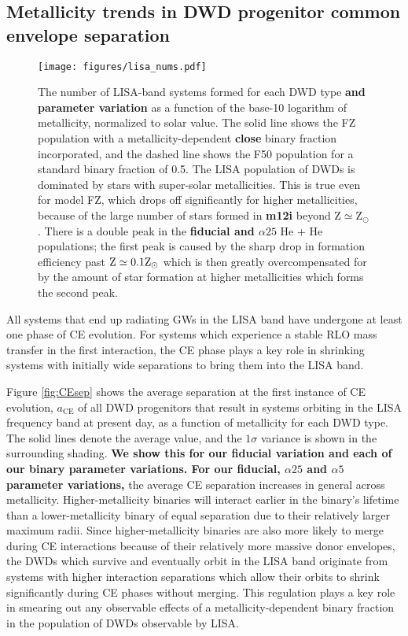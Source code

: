 \documentclass[twocolumn, linenumbers]{aastex631}
\begin{document}
\subsection{Metallicity trends in DWD progenitor common envelope separation}\label{sec:CEsep}

\begin{figure*}
	\texttt{[image: figures/lisa\_nums.pdf]}
    \caption{The number of LISA-band systems formed for each DWD type \textbf{and parameter variation} as a function of the base-10 logarithm of metallicity, normalized to solar value. The solid line shows the FZ population with a metallicity-dependent \textbf{close} binary fraction incorporated, and the dashed line shows the F50 population for a standard binary fraction of 0.5. The LISA population of DWDs is dominated by stars with super-solar metallicities. This is true even for model FZ, which drops off significantly for higher metallicities, because of the large number of stars formed in \textbf{m12i} beyond Z$\simeq$Z$_\odot$. There is a double peak in the \textbf{fiducial and $\alpha25$} He + He populations; the first peak is caused by the sharp drop in formation efficiency past $\rm{Z}\simeq0.1 \rm{Z}_\odot$ which is then greatly overcompensated for by the amount of star formation at higher metallicities which forms the second peak.}
    \label{fig:lisa_nums}
\end{figure*}

All systems that end up radiating GWs in the LISA band have undergone at least one phase of CE evolution. For systems which experience a stable RLO mass transfer in the first interaction, the CE phase plays a key role in shrinking systems with initially wide separations to bring them into the LISA band. 

Figure \ref{fig:CEsep} shows the average separation at the first instance of CE evolution, $a_{\text{CE}}$ of all DWD progenitors that result in systems orbiting in the LISA frequency band at present day, as a function of metallicity for each DWD type. The solid lines denote the average value, and the $1\sigma$ variance is shown in the surrounding shading. \textbf{We show this for our fiducial variation and each of our binary parameter variations. For our fiducial, $\alpha25$ and $\alpha5$ parameter variations,} the average CE separation increases in general across metallicity. Higher-metallicity binaries will interact earlier in the binary's lifetime than a lower-metallicity binary of equal separation due to their relatively larger maximum radii. Since higher-metallicity binaries are also more likely to merge during CE interactions because of their relatively more massive donor envelopes, the DWDs which survive and eventually orbit in the LISA band originate from systems with higher interaction separations which allow their orbits to shrink significantly during CE phases without merging. This regulation plays a key role in smearing out any observable effects of a metallicity-dependent binary fraction in the population of DWDs observable by LISA. 
\end{document}
